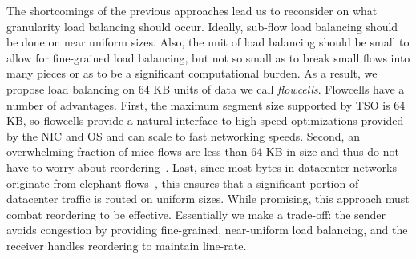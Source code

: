The shortcomings of the previous approaches lead us to reconsider on what granularity
load balancing should occur. 
Ideally, sub-flow load balancing should be done on near uniform sizes.
Also, the unit of load balancing should be small to
allow for fine-grained load balancing, but not so small as to break small flows into 
many pieces or as to be a significant computational burden. As a result, we
propose load balancing on 64 KB units of data we call {\em flowcells}. Flowcells
have a number of advantages. First, the maximum segment size supported by TSO
is 64 KB, so flowcells provide a natural interface to high speed optimizations provided
by the NIC and OS and can scale to fast networking speeds. Second, an overwhelming fraction of mice flows are less than 64 KB in size
 and thus do not have to worry about reordering~\cite{benson10,vl2,kandula2009nature}.
Last, since most bytes in datacenter networks originate from elephant flows~\cite{kandula2009nature,benson10,dctcp},
this ensures that a significant portion of datacenter traffic is routed on uniform
sizes. While promising, this approach must combat reordering to be effective. 
Essentially we make a trade-off: 
the sender avoids congestion by providing fine-grained, near-uniform load balancing,
and the receiver handles reordering to maintain line-rate.



